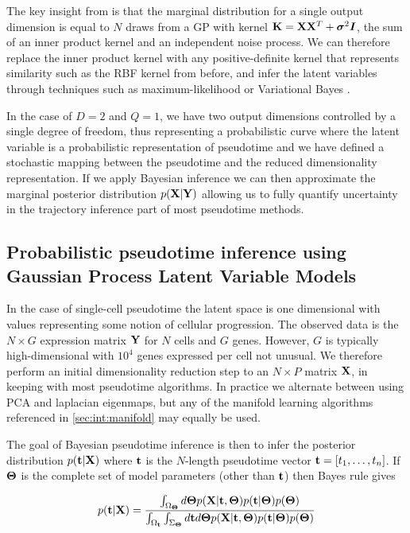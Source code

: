The key insight from \cite{Lawrence2005-cu} is that the marginal distribution for a single output dimension is equal to $N$ draws from a GP with kernel ${\bf K} = {\bf X} {\bf X}^T + {\bm \sigma}^2 {\bm I}$, the sum of an inner product kernel and an independent noise process. We can therefore replace the inner product kernel with any positive-definite kernel that represents similarity such as the RBF kernel from before, and infer the latent variables through techniques such as maximum-likelihood \cite{Lawrence2005-cu} or Variational Bayes \cite{titsias2009variational}.

In the case of $D = 2$ and $Q = 1$, we have two output dimensions controlled by a single degree of freedom, thus representing a probabilistic curve where the latent variable is a probabilistic representation of pseudotime and we have defined a stochastic mapping between the pseudotime and the reduced dimensionality representation. If we apply Bayesian inference we can then approximate the marginal posterior distribution $p({\bf X} | {\bf Y})$ allowing us to fully quantify uncertainty in the trajectory inference part of most pseudotime methods.


\subsection{Probabilistic pseudotime inference using Gaussian Process Latent Variable Models}

In the case of single-cell pseudotime the latent space is one dimensional with values representing some notion of cellular progression. The observed data is the $N \times G$ expression matrix $\mathbf{Y}$ for $N$ cells and $G$ genes. However, $G$ is typically high-dimensional with $10^4$ genes expressed per cell not unusual. We therefore perform an initial dimensionality reduction step to an $N \times P$ matrix $\mathbf{X}$, in keeping with most pseudotime algorithms. In practice we alternate between using PCA and laplacian eigenmaps, but any of the manifold learning algorithms referenced in \ref{sec:int:manifold} may equally be used.

The goal of Bayesian pseudotime inference is then to infer the posterior distribution $p(\mathbf{t}|\mathbf{X})$ where ${\bf t}$ is the $N$-length pseudotime vector ${\bf t} = [ t_1, \dots, t_n ]$. If $\bm{\Theta}$ is  the complete set of model parameters (other than $\mathbf{t}$) then Bayes rule gives

\begin{equation}
	p(\mathbf{t} | \mathbf{X}) = \frac{
\int_{\Omega_{\bm{\Theta}}} d\bm{\Theta} p(\mathbf{X} | \mathbf{t}, \bm{\Theta}) p(\mathbf{t} | \bm{\Theta}) p(\bm{\Theta})
	}{
\int_{\Omega_{\mathbf{t}}} \int_{\Sigma_{\bm{\Theta}}} d\mathbf{t} d\bm{\Theta} p(\mathbf{X} | \mathbf{t}, \bm{\Theta}) p(\mathbf{t} | \bm{\Theta}) p(\bm{\Theta})
	}
\end{equation} \label{eq:bayesrule}

